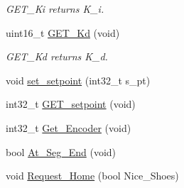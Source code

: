 \begin{DoxyCompactItemize}
\begin{DoxyCompactList}\small\item\em G\-E\-T\-\_\-\-Ki returns K\-\_\-i. \end{DoxyCompactList}\item 
\hypertarget{classtask__PID_a5ed698383876a6968310bac2f70f78f9}{uint16\-\_\-t \hyperlink{classtask__PID_a5ed698383876a6968310bac2f70f78f9}{G\-E\-T\-\_\-\-Kd} (void)}\label{classtask__PID_a5ed698383876a6968310bac2f70f78f9}

\begin{DoxyCompactList}\small\item\em G\-E\-T\-\_\-\-Kd returns K\-\_\-d. \end{DoxyCompactList}\item 
void \hyperlink{classtask__PID_a5112215d3f09f07c8269724417b81232}{set\-\_\-setpoint} (int32\-\_\-t s\-\_\-pt)
\item 
int32\-\_\-t \hyperlink{classtask__PID_abb3876eab56d800fa45d99b77d0fed40}{G\-E\-T\-\_\-setpoint} (void)
\item 
int32\-\_\-t \hyperlink{classtask__PID_a3df066e30232d9262cffe00a209aa838}{Get\-\_\-\-Encoder} (void)
\item 
bool \hyperlink{classtask__PID_abb2aa5643b7c4909d930dfb281a6eaa2}{At\-\_\-\-Seg\-\_\-\-End} (void)
\item 
void \hyperlink{classtask__PID_a5d79acbd155902dc1a10d1968f4c6050}{Request\-\_\-\-Home} (bool Nice\-\_\-\-Shoes)
\end{DoxyCompactItemize}
